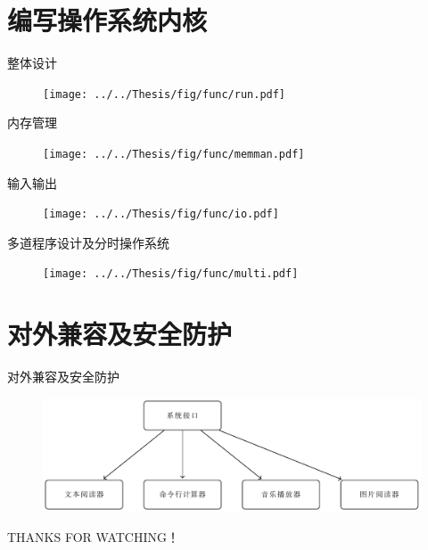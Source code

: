 \documentclass{beamer}
\begin{document}
    \section{编写操作系统内核}
    \begin{frame}{整体设计}
      \begin{figure}[H]
        \centering
        \texttt{[image: ../../Thesis/fig/func/run.pdf]}
      \end{figure}
    \end{frame}
    \begin{frame}{内存管理}
      \begin{figure}[H]
        \centering
        \texttt{[image: ../../Thesis/fig/func/memman.pdf]}
      \end{figure}
    \end{frame}
    \begin{frame}{输入输出}
      \begin{figure}[H]
        \centering
        \texttt{[image: ../../Thesis/fig/func/io.pdf]}
      \end{figure}
    \end{frame}
    \begin{frame}{多道程序设计及分时操作系统}
      \begin{figure}[H]
        \centering
        \texttt{[image: ../../Thesis/fig/func/multi.pdf]}
      \end{figure}
    \end{frame}
    
    \section{对外兼容及安全防护}
    
      \begin{frame}{对外兼容及安全防护}
        \begin{figure}[H]
          \centering
          \includegraphics[width=.8\textwidth]{fig/sc.pdf}
        \end{figure}
      \end{frame}

    \begin{frame}{}
    
      THANKS FOR WATCHING！
      
    \end{frame}
    
    
\end{document}
